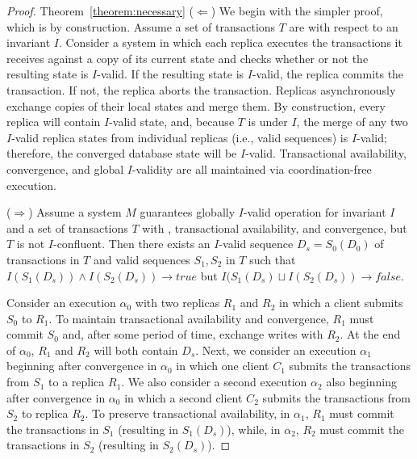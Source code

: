 \begin{proof}{Theorem~\ref{theorem:necessary}}
($\Leftarrow$) We begin with the simpler proof, which is by
  construction. Assume a set of transactions $T$ are \iconfluent with
  respect to an invariant $I$. Consider a system in which each replica
  executes the transactions it receives against a copy of its current
  state and checks whether or not the resulting state is $I$-valid. If
  the resulting state is $I$-valid, the replica commits the
  transaction. If not, the replica aborts the transaction. Replicas
  asynchronously exchange copies of their local states and merge
  them. By construction, every replica will contain $I$-valid state,
  and, because $T$ is \iconfluent under $I$, the merge of any two
  $I$-valid replica states from individual replicas (i.e., valid
  sequences) is $I$-valid; therefore, the converged database state
  will be $I$-valid. Transactional availability, convergence, and
  global $I$-validity are all maintained via coordination-free
  execution.

($\Rightarrow$) Assume a system $M$ guarantees globally $I$-valid
  operation for invariant $I$ and a set of transactions $T$ with
  \cfreedom, transactional availability, and convergence, but $T$ is
  not $I$-confluent. Then there exists an $I$-valid sequence
  $D_s=S_0(D_0)$ of transactions in $T$ and valid sequences $S_1,S_2$
  in $T$ such that $I(S_1(D_s)) \wedge I(S_2(D_s)) \rightarrow true$
  but $I(S_1(D_s) \sqcup I(S_2(D_s)) \rightarrow false$.

  Consider an execution $\alpha_0$ with two replicas $R_1$ and $R_2$
  in which a client submits $S_0$ to $R_1$. To maintain transactional
  availability and convergence, $R_1$ must commit $S_0$ and, after
  some period of time, exchange writes with $R_2$. At the end of
  $\alpha_0$, $R_1$ and $R_2$ will both contain $D_s$. Next, we
  consider an execution $\alpha_1$ beginning after convergence in
  $\alpha_0$ in which one client $C_1$ submits the transactions from
  $S_1$ to a replica $R_1$. We also consider a second execution
  $\alpha_2$ also beginning after convergence in $\alpha_0$ in which a
  second client $C_2$ submits the transactions from $S_2$ to replica
  $R_2$. To preserve transactional availability, in $\alpha_1$, $R_1$
  must commit the transactions in $S_1$ (resulting in $S_1(D_s)$),
  while, in $\alpha_2$, $R_2$ must commit the transactions in $S_2$
  (resulting in $S_2(D_s)$).


\end{proof}
